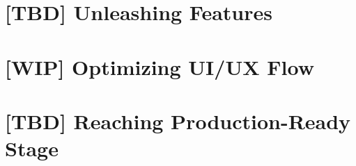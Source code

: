 \documentclass[12pt, a4paper, twoside]{extreport}
\begin{document}
\newpage
\section{[TBD] Unleashing Features}


\newpage
\section{[WIP] Optimizing UI/UX Flow}


\newpage
\section{[TBD] Reaching Production-Ready Stage}




\thispagestyle{empty}



~
\end{document}
